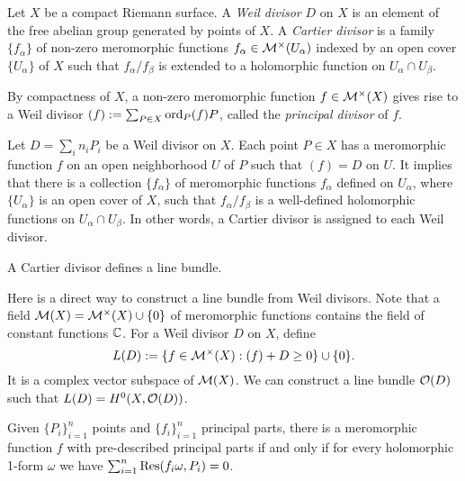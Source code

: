 \documentclass{../../large}
\begin{document}
\begin{prb}[Divisors]
Let $X$ be a compact Riemann surface.
A \emph{Weil divisor} $D$ on $X$ is an element of the free abelian group generated by points of $X$.
A \emph{Cartier divisor} is a family $\{f_\alpha\}$ of non-zero meromorphic functions $f_\alpha\in\mathcal{M}^\times(U_\alpha)$ indexed by an open cover $\{U_\alpha\}$ of $X$ such that $f_\alpha/f_\beta$ is extended to a holomorphic function on $U_\alpha\cap U_\beta$.




By compactness of $X$, a non-zero meromorphic function $f\in\mathcal{M}^\times(X)$ gives rise to a Weil divisor $(f):=\sum_{P\in X}\operatorname{ord}_P(f)P$, called the \emph{principal divisor} of $f$.

Let $D=\sum_i n_iP_i$ be a Weil divisor on $X$.
Each point $P\in X$ has a meromorphic function $f$ on an open neighborhood $U$ of $P$ such that $(f)=D$ on $U$.
It implies that there is a collection $\{f_\alpha\}$ of meromorphic functions $f_\alpha$ defined on $U_\alpha$, where $\{U_\alpha\}$ is an open cover of $X$, such that $f_\alpha/f_\beta$ is a well-defined holomorphic functions on $U_\alpha\cap U_\beta$.
In other words, a Cartier divisor is assigned to each Weil divisor.


A Cartier divisor defines a line bundle.

Here is a direct way to construct a line bundle from Weil divisors.
Note that a field $\mathcal{M}(X)=\mathcal{M}^\times(X)\cup\{0\}$ of meromorphic functions contains the field of constant functions $\mathbb{C}$.
For a Weil divisor $D$ on $X$, define
\[L(D):=\{f\in\mathcal{M}^\times(X):(f)+D\ge0\}\cup\{0\}.\]
It is a complex vector subspace of $\mathcal{M}(X)$.
We can construct a line bundle $\mathcal{O}(D)$ such that $L(D)=H^0(X,\mathcal{O}(D))$.

\end{prb}




\begin{prb}
Given $\{P_i\}_{i=1}^n$ points and $\{f_i\}_{i=1}^n$ principal parts, there is a meromorphic function $f$ with pre-described principal parts if and only if for every holomorphic 1-form $\omega$ we have $\sum_{i=1}^n\operatorname*{Res}(f_i\omega,P_i)=0$.
\end{prb}
\end{document}
